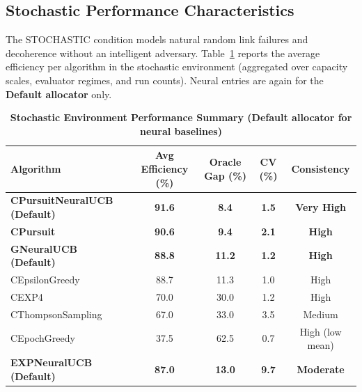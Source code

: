 \documentclass[12pt,a4paper]{article}
\newcommand{\stochastic}[1]{\textcolor{stochasticcolor}{\textbf{#1}}}
\newcommand{\legacy}[1]{\textcolor{legacycolor}{\textbf{#1}}}
\newcommand{\neural}[1]{\textcolor{neuralcolor}{\textbf{#1}}}
\begin{document}
\begin{tcolorbox}[colback=stochasticcolor!10,colframe=stochasticcolor,title=\textbf{Stochastic Environment Deep Analysis (1$\times$–2$\times$ Capacities, T/Tb Combined)}]

\subsection{Stochastic Performance Characteristics}

The STOCHASTIC condition models natural random link failures and decoherence without an intelligent adversary. Table~\ref{tab:stoch-performance} reports the average efficiency per algorithm in the stochastic environment (aggregated over capacity scales, evaluator regimes, and run counts). Neural entries are again for the \textbf{Default allocator} only.

\begin{table}[H]
\small
\centering
\caption{\stochastic{Stochastic Environment Performance Summary (Default allocator for neural baselines)}}
\label{tab:stoch-performance}
\begin{tabular}{|l|c|c|c|c|}
\hline
\textbf{Algorithm} & \textbf{Avg Efficiency (\%)} & \textbf{Oracle Gap (\%)} & \textbf{CV (\%)} & \textbf{Consistency} \\
\hline
\hline
\neural{CPursuitNeuralUCB (Default)}   & \neural{\textbf{91.6}} & \neural{8.4}  & \neural{1.5}  & \neural{Very High} \\
\stochastic{CPursuit}                  & \stochastic{\textbf{90.6}} & \stochastic{9.4}  & \stochastic{2.1}  & \stochastic{High} \\
\neural{GNeuralUCB (Default)}          & \neural{\textbf{88.8}} & \neural{11.2} & \neural{1.2}  & \neural{High} \\
CEpsilonGreedy                         & 88.7                    & 11.3          & 1.0           & High \\
CEXP4                                  & 70.0                    & 30.0          & 1.2           & High \\
CThompsonSampling                      & 67.0                    & 33.0          & 3.5           & Medium \\
CEpochGreedy                           & 37.5                    & 62.5          & 0.7           & High (low mean) \\
\legacy{EXPNeuralUCB (Default)}        & \legacy{87.0}           & \legacy{13.0} & \legacy{9.7}  & \legacy{Moderate} \\
\hline
\end{tabular}
\end{table}


\end{tcolorbox}
\end{document}
